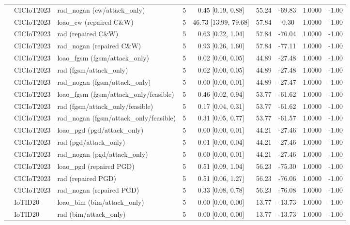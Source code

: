 \begin{table}[t]
\begin{tabular}{lllcccccc}
 & CICIoT2023 & rad\_nogan (cw/attack\_only) & 5 & 0.45 [0.19, 0.88] & 55.24 & -69.83 & 1.0000 & -1.00 \\
 & CICIoT2023 & loao\_cw (repaired C\&W) & 5 & 46.73 [13.99, 79.68] & 57.84 & -0.30 & 1.0000 & -1.00 \\
 & CICIoT2023 & rad (repaired C\&W) & 5 & 0.63 [0.22, 1.04] & 57.84 & -76.04 & 1.0000 & -1.00 \\
 & CICIoT2023 & rad\_nogan (repaired C\&W) & 5 & 0.93 [0.26, 1.60] & 57.84 & -77.11 & 1.0000 & -1.00 \\
 & CICIoT2023 & loao\_fgsm (fgsm/attack\_only) & 5 & 0.02 [0.00, 0.05] & 44.89 & -27.48 & 1.0000 & -1.00 \\
 & CICIoT2023 & rad (fgsm/attack\_only) & 5 & 0.02 [0.00, 0.05] & 44.89 & -27.48 & 1.0000 & -1.00 \\
 & CICIoT2023 & rad\_nogan (fgsm/attack\_only) & 5 & 0.00 [0.00, 0.01] & 44.89 & -27.47 & 1.0000 & -1.00 \\
 & CICIoT2023 & loao\_fgsm (fgsm/attack\_only/feasible) & 5 & 0.46 [0.02, 0.94] & 53.77 & -61.62 & 1.0000 & -1.00 \\
 & CICIoT2023 & rad (fgsm/attack\_only/feasible) & 5 & 0.17 [0.04, 0.31] & 53.77 & -61.62 & 1.0000 & -1.00 \\
 & CICIoT2023 & rad\_nogan (fgsm/attack\_only/feasible) & 5 & 0.31 [0.05, 0.77] & 53.77 & -61.57 & 1.0000 & -1.00 \\
 & CICIoT2023 & loao\_pgd (pgd/attack\_only) & 5 & 0.00 [0.00, 0.01] & 44.21 & -27.46 & 1.0000 & -1.00 \\
 & CICIoT2023 & rad (pgd/attack\_only) & 5 & 0.01 [0.00, 0.04] & 44.21 & -27.46 & 1.0000 & -1.00 \\
 & CICIoT2023 & rad\_nogan (pgd/attack\_only) & 5 & 0.00 [0.00, 0.01] & 44.21 & -27.46 & 1.0000 & -1.00 \\
 & CICIoT2023 & loao\_pgd (repaired PGD) & 5 & 0.51 [0.09, 1.04] & 56.23 & -75.30 & 1.0000 & -1.00 \\
 & CICIoT2023 & rad (repaired PGD) & 5 & 0.51 [0.06, 1.27] & 56.23 & -76.06 & 1.0000 & -1.00 \\
 & CICIoT2023 & rad\_nogan (repaired PGD) & 5 & 0.33 [0.08, 0.78] & 56.23 & -76.08 & 1.0000 & -1.00 \\
 & IoTID20 & loao\_bim (bim/attack\_only) & 5 & 0.00 [0.00, 0.00] & 13.77 & -13.73 & 1.0000 & -1.00 \\
 & IoTID20 & rad (bim/attack\_only) & 5 & 0.00 [0.00, 0.00] & 13.77 & -13.73 & 1.0000 & -1.00 \\

\end{tabular}
\end{table}
